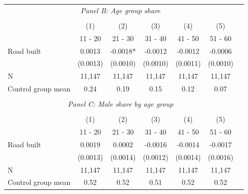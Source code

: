 \begin{tabular}{l*{6}{c}}
\\ \multicolumn{6}{c}{\textit{Panel B: Age group share}} \\\\ [-1ex] \hline            &\multicolumn{1}{c}{(1)} & \multicolumn{1}{c}{(2)} &\multicolumn{1}{c}{(3)}          &\multicolumn{1}{c}{(4)} &\multicolumn{1}{c}{(5)}  \\          &\multicolumn{1}{c}{11 - 20} &\multicolumn{1}{c}{21 - 30}          &\multicolumn{1}{c}{31 - 40} &\multicolumn{1}{c}{41 - 50}  &\multicolumn{1}{c}{51 - 60}  \\ \hline
Road built               &      0.0013   &     -0.0018*  &     -0.0012   &     -0.0012   &     -0.0006   \\
                         &    (0.0013)   &    (0.0010)   &    (0.0010)   &    (0.0011)   &    (0.0010)   \\
\hline
N                        &      11,147   &      11,147   &      11,147   &      11,147   &      11,147   \\
Control group mean       &        0.24   &        0.19   &        0.15   &        0.12   &        0.07   \\
\hline \\ \multicolumn{6}{c}{\textit{Panel C: Male share by age group}} \\\\ [-1ex] \hline            &\multicolumn{1}{c}{(1)} & \multicolumn{1}{c}{(2)} &\multicolumn{1}{c}{(3)}          &\multicolumn{1}{c}{(4)} &\multicolumn{1}{c}{(5)}  \\          &\multicolumn{1}{c}{11 - 20} &\multicolumn{1}{c}{21 - 30}          &\multicolumn{1}{c}{31 - 40} &\multicolumn{1}{c}{41 - 50}  &\multicolumn{1}{c}{51 - 60}  \\ \hline
Road built               &      0.0019   &      0.0002   &     -0.0016   &     -0.0014   &     -0.0017   \\
                         &    (0.0013)   &    (0.0014)   &    (0.0012)   &    (0.0014)   &    (0.0016)   \\
\hline
N                        &      11,147   &      11,147   &      11,147   &      11,147   &      11,147   \\
Control group mean       &        0.52   &        0.52   &        0.51   &        0.52   &        0.52   \\
\hline\hline \end{tabular}
